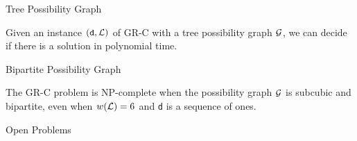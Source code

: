 \begin{frame}{Tree Possibility Graph}
    \begin{proposition}[1]
        Given an instance $(\texttt{d}, \mathcal{L})$ of GR-C with a tree possibility graph $\mathcal{G}$, we can decide if there is a solution in polynomial time.
    \end{proposition}
\end{frame}

\begin{frame}{Bipartite Possibility Graph}
    \begin{theorem}[3]
        The GR-C problem is NP-complete when the possibility graph $\mathcal{G}$ is subcubic and bipartite, even when $w(\mathcal{L}) = 6$ and \texttt{d} is a sequence of ones.
    \end{theorem}
\end{frame}

\begin{frame}{Open Problems}
    \centering

\end{frame}